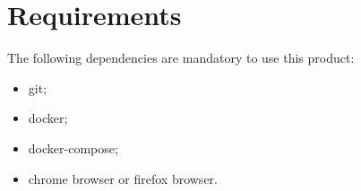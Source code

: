 \section{Requirements}

The following dependencies are mandatory to use this product:
\begin{itemize}
   \item git;
   \item docker;
   \item docker-compose;
   \item chrome browser or firefox browser.
\end{itemize}